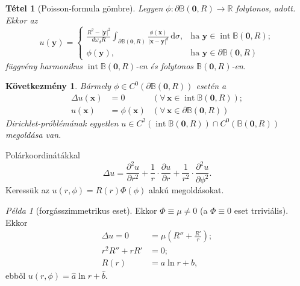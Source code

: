 \documentclass[%
	DIV=15,appendixprefix]{scrreprt}
\newtheorem*{tetel}{Tétel}
\newtheorem*{kovet}{Következmény}
\theoremstyle{definition}
\theoremstyle{remark}
\newtheorem*{pelda}{Példa}
\newcommand{\ball}{\mathbb{B}}
\DeclareMathOperator{\interior}{int}
\newcommand{\ballin}{\interior\mathbb{B}}
\begin{document}
\begin{tetel}[Poisson-formula gömbre]
	Legyen $ \phi \colon \partial \ball \left( \mathbf{ 0 },{} R \right) \rightarrow \mathbb{ R } $
	folytonos, adott. Ekkor az
	\begin{equation*}
		u \left( \mathbf{ y } \right) = \begin{cases}
			\frac{ R^{ 2 } - \left| \mathbf{ y } \right|^{ 2 } }{ d
				\omega_{ d } R } \int_{ \partial \ball \left( \mathbf{ 0 },{} R \right) } \frac{
				\phi \left( \mathbf{ x } \right)}{ \left| \mathbf{ x } - \mathbf{ y } \right|^{ d }
				} \, \mathrm{ d }\sigma, & \text{ha } \mathbf{ y } \in \ballin \left( \mathbf{ 0
				},{} R
				\right);\\
			\phi \left( \mathbf{ y } \right), & \text{ha } \mathbf{ y } \in \partial \ball \left(
				\mathbf{ 0 },{} R \right)
		\end{cases}
	\end{equation*}
	függvény harmonikus $ \ballin \left( \mathbf{ 0 },{} R \right) $-en és folytonos $ \ball \left(
	\mathbf{ 0 },{} R \right) $-en.
\end{tetel}
%
\begin{kovet}
Bármely $ \phi \in C^{ 0 } \left( \partial \ball \left( \mathbf{ 0 },{} R \right) \right) $ esetén
a
\begin{align*}
	\Delta u \left( \mathbf{ x } \right) &= 0 & \left( \forall \, \mathbf{ x } \in \ballin \left(
		\mathbf{ 0 },{} R \right) \right);\\
	u \left( \mathbf{ x } \right) &= \phi \left( \mathbf{ x } \right) & \left( \forall \,
		\mathbf{ x } \in \partial \ball \left( \mathbf{ 0 },{} R \right) \right)
\end{align*}
Dirichlet-próblémának egyetlen $ u \in C^{ 2 } \left( \ballin \left( \mathbf{ 0 },{} R \right)
\right) \cap C^{ 0 } \left( \ball \left( \mathbf{ 0 },{} R \right) \right) $ megoldása van.
\end{kovet}
%
Polárkoordinátákkal
\begin{equation*}
	\Delta u = \frac{ \partial^{ 2 } u }{ \partial r^{ 2 } } + \frac{ 1 }{ r } \cdot \frac{ \partial
	u }{ \partial r } + \frac{ 1 }{ r^{ 2 } } \cdot \frac{ \partial^{ 2 } u }{ \partial \phi^{ 2 }
	}.
\end{equation*}
Keressük az $ u \left( r,{} \phi \right) = R \left( r \right) \Phi \left( \phi
\right) $ alakú megoldásokat.
\begin{pelda}[forgásszimmetrikus eset]
	Ekkor $ \Phi \equiv \mu \neq 0 $ (a $ \Phi \equiv 0 $ eset trriviális). Ekkor
	\begin{align*}
		\Delta u = 0 &= \mu \left( R'' + \frac{ R' }{ r } \right);\\
		r^{ 2 } R'' + r R' &= 0;\\
		R \left( r \right) &= a \ln r + b,
	\end{align*}
	ebből $ u \left( r,{} \phi \right) = \hat{ a } \ln r + \hat{ b } $.
\end{pelda}
%
\end{document}
